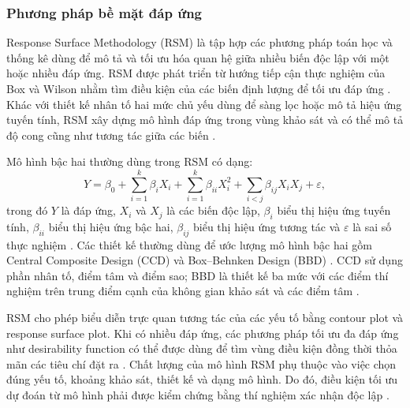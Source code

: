 \subsubsection{Phương pháp bề mặt đáp ứng}
Response Surface Methodology (RSM) là tập hợp các phương pháp toán học và thống kê dùng để mô tả và tối ưu hóa quan hệ giữa nhiều biến độc lập với một hoặc nhiều đáp ứng.
RSM được phát triển từ hướng tiếp cận thực nghiệm của Box và Wilson nhằm tìm điều kiện của các biến định lượng để tối ưu đáp ứng \parencite{boxwilson1951,khuri2010}.
Khác với thiết kế nhân tố hai mức chủ yếu dùng để sàng lọc hoặc mô tả hiệu ứng tuyến tính, RSM xây dựng mô hình đáp ứng trong vùng khảo sát và có thể mô tả độ cong cũng như tương tác giữa các biến \parencite{bezerra2008,khuri2010}.
\par
Mô hình bậc hai thường dùng trong RSM có dạng:
\[
Y = \beta_0 + \sum_{i=1}^{k}\beta_iX_i + \sum_{i=1}^{k}\beta_{ii}X_i^2 + \sum_{i<j}\beta_{ij}X_iX_j + \varepsilon,
\]
trong đó $Y$ là đáp ứng, $X_i$ và $X_j$ là các biến độc lập, $\beta_i$ biểu thị hiệu ứng tuyến tính, $\beta_{ii}$ biểu thị hiệu ứng bậc hai, $\beta_{ij}$ biểu thị hiệu ứng tương tác và $\varepsilon$ là sai số thực nghiệm \parencite{khuri2010}.
Các thiết kế thường dùng để ước lượng mô hình bậc hai gồm Central Composite Design (CCD) và Box--Behnken Design (BBD) \parencite{bezerra2008,boxbehnken1960}.
CCD sử dụng phần nhân tố, điểm tâm và điểm sao; BBD là thiết kế ba mức với các điểm thí nghiệm trên trung điểm cạnh của không gian khảo sát và các điểm tâm \parencite{boxbehnken1960,montgomery2017}.
\par
RSM cho phép biểu diễn trực quan tương tác của các yếu tố bằng contour plot và response surface plot.
Khi có nhiều đáp ứng, các phương pháp tối ưu đa đáp ứng như desirability function có thể được dùng để tìm vùng điều kiện đồng thời thỏa mãn các tiêu chí đặt ra \parencite{bezerra2008}.
Chất lượng của mô hình RSM phụ thuộc vào việc chọn đúng yếu tố, khoảng khảo sát, thiết kế và dạng mô hình.
Do đó, điều kiện tối ưu dự đoán từ mô hình phải được kiểm chứng bằng thí nghiệm xác nhận độc lập \parencite{khuri2010,montgomery2017}.

